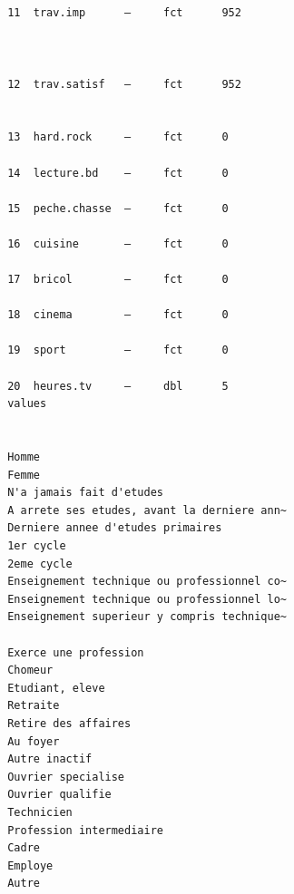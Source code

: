 \documentclass[
  letterpaper,
  DIV=11,
  numbers=noendperiod,
  oneside]{scrreprt}
\begin{document}
\begin{verbatim}
                                         
                                         
 11  trav.imp      —     fct      952    
                                         
                                         
                                         
 12  trav.satisf   —     fct      952    
                                         
                                         
 13  hard.rock     —     fct      0      
                                         
 14  lecture.bd    —     fct      0      
                                         
 15  peche.chasse  —     fct      0      
                                         
 16  cuisine       —     fct      0      
                                         
 17  bricol        —     fct      0      
                                         
 18  cinema        —     fct      0      
                                         
 19  sport         —     fct      0      
                                         
 20  heures.tv     —     dbl      5      
 values                                     
                                            
                                            
 Homme                                      
 Femme                                      
 N'a jamais fait d'etudes                   
 A arrete ses etudes, avant la derniere ann~
 Derniere annee d'etudes primaires          
 1er cycle                                  
 2eme cycle                                 
 Enseignement technique ou professionnel co~
 Enseignement technique ou professionnel lo~
 Enseignement superieur y compris technique~
                                            
 Exerce une profession                      
 Chomeur                                    
 Etudiant, eleve                            
 Retraite                                   
 Retire des affaires                        
 Au foyer                                   
 Autre inactif                              
 Ouvrier specialise                         
 Ouvrier qualifie                           
 Technicien                                 
 Profession intermediaire                   
 Cadre                                      
 Employe                                    
 Autre                                      
                                            

\end{verbatim}
\end{document}

